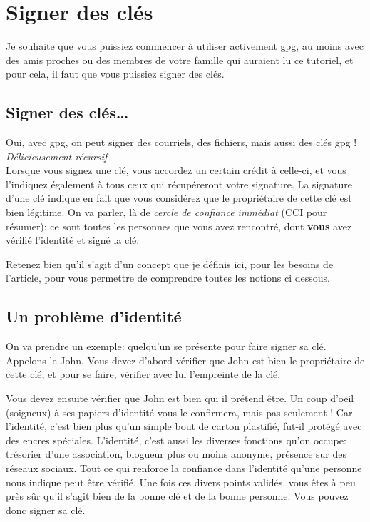 \chapter{Signer des clés}

Je souhaite que vous puissiez commencer à utiliser activement gpg, au
moins avec des amis proches ou des membres de votre famille qui auraient
lu ce tutoriel, et pour cela, il faut que vous puissiez signer des clés.

\section{Signer des clés\ldots{}}\label{signer-des-cluxe9s}

Oui, avec gpg, on peut signer des courriels, des fichiers, mais aussi
des clés gpg !\\

\emph{Délicieusement récursif}\\

Lorsque vous signez une clé, vous accordez un certain crédit à celle-ci,
et vous l'indiquez également à tous ceux qui récupéreront votre
signature. La signature d'une clé indique en fait que vous considérez que le
propriétaire de cette clé est bien légitime. On va parler, là de \emph{cercle de confiance immédiat} (CCI pour
résumer): ce sont toutes les personnes que vous avez rencontré, dont
\textbf{vous} avez vérifié l'identité et signé la clé.

Retenez bien qu'il s'agit d'un concept que je définis ici, pour les
besoins de l'article, pour vous permettre de comprendre toutes les
notions ci dessous.

\section{Un problème d'identité}\label{un-probluxe8me-didentituxe9}

On va prendre un exemple: quelqu'un se présente pour faire signer sa
clé. Appelons le John. Vous devez d'abord vérifier que John est bien le propriétaire de cette
clé, et pour se faire, vérifier avec lui l'empreinte de la clé.

Vous devez ensuite vérifier que John est bien qui il prétend être. Un
coup d'oeil (soigneux) à ses papiers d'identité vous le
confirmera, mais pas seulement ! Car l'identité, c'est bien plus
qu'un simple bout de carton plastifié, fut-il protégé avec des encres
spéciales. L'identité, c'est aussi les diverses fonctions qu'on occupe: trésorier
d'une association, blogueur plus ou moins anonyme, présence sur des
réseaux sociaux. Tout ce qui renforce la confiance dans l'identité qu'une personne nous
indique peut être vérifié. Une fois ces divers points validés, vous êtes à peu près sûr qu'il
s'agit bien de la bonne clé et de la bonne personne. Vous pouvez donc
signer sa clé.


